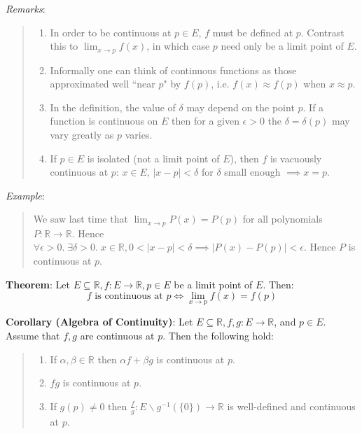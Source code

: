\documentclass[11pt]{article}
\begin{document}
\emph{Remarks}:
\begin{quote}\vspace{-0.3cm}
	\begin{enumerate}
	\item In order to be continuous at $p \in E$, $f$ must be defined at $p$. Contrast this to $\lim_{x \to p} f(x)$, in which case $p$ need only be a limit point of $E$.
	\item Informally one can think of continuous functions as those approximated well ``near $p$" by $f(p)$, i.e. $f(x) \approx f(p)$ when $x \approx p$.
	\item In the definition, the value of $\delta$ may depend on the point $p$. If a function is continuous on $E$ then for a given $\epsilon > 0$ the $\delta = \delta(p)$ may vary greatly as $p$ varies.
	\item If $p \in E$ is isolated (not a limit point of $E$), then $f$ is vacuously continuous at $p$: $x \in E$, $|x-p| < \delta$ for $\delta$ small enough $\implies x = p$.
	\end{enumerate}
\end{quote}

\emph{Example}:
\begin{quote}\vspace{-0.3cm}
We saw last time that $\lim_{x \to p} P(x) = P(p)$ for all polynomials $P : \mathbb{R} \to \mathbb{R}$. Hence $\forall \epsilon > 0.\; \exists \delta > 0.\; x \in \mathbb{R}, 0 < |x-p| < \delta \implies |P(x) - P(p)| < \epsilon$. Hence $P$ is continuous at $p$.
\end{quote}

\textbf{Theorem}: Let $E \subseteq \mathbb{R}, f : E \to \mathbb{R}, p \in E$ be a limit point of $E$. Then:
\begin{displaymath}
f \text{ is continuous at } p \iff \lim_{x \to p} f(x) = f(p)
\end{displaymath}

\textbf{Corollary (Algebra of Continuity)}: Let $E \subseteq \mathbb{R}, f, g : E \to \mathbb{R}$, and $p \in E$. Assume that $f, g$ are continuous at $p$. Then the following hold:
\begin{quote}\vspace{-0.3cm}
	\begin{enumerate}
	\item If $\alpha, \beta \in \mathbb{R}$ then $\alpha f + \beta g$ is continuous at $p$.
	\item $fg$ is continuous at $p$.
	\item If $g(p) \neq 0$ then $\frac{f}{g} : E \backslash g^{-1}(\{0\}) \to \mathbb{R}$ is well-defined and continuous at $p$.
	\end{enumerate}
\end{quote}
\end{document}
